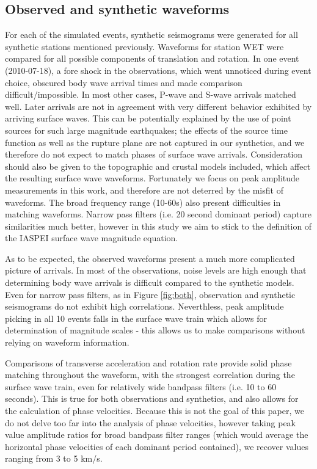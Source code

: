 \documentclass{gji}
\begin{document}
\subsection{Observed and synthetic waveforms}
For each of the simulated events, synthetic seismograms were generated for all synthetic stations mentioned previously. Waveforms for station WET were compared for all possible components of translation and rotation. In one event (2010-07-18), a fore shock in the observations, which went unnoticed during event choice, obscured body wave arrival times and made comparison difficult/impossible. In most other cases, P-wave and S-wave arrivals matched well. Later arrivals are not in agreement with very different behavior exhibited by arriving surface waves. This can be potentially explained by the use of point sources for such large magnitude earthquakes; the effects of the source time function as well as the rupture plane are not captured in our synthetics, and we therefore do not expect to match phases of surface wave arrivals. Consideration should also be given to the topographic and crustal models included, which affect the resulting surface wave waveforms. Fortunately we focus on peak amplitude measurements in this work, and therefore are not deterred by the misfit of waveforms. The broad frequency range (10-60s) also present difficulties in matching waveforms. Narrow pass filters (i.e. 20 second dominant period) capture similarities much better, however in this study we aim to stick to the definition of the IASPEI surface wave magnitude equation.


As to be expected, the observed waveforms present a much more complicated picture of arrivals. In most of the observations, noise levels are high enough that determining body wave arrivals is difficult compared to the synthetic models. Even for narrow pass filters, as in Figure \ref{fig:both}, observation and synthetic seismograms do not exhibit high correlations. Neverthless, peak amplitude picking in all 10 events falls in the surface wave train which allows for determination of magnitude scales - this allows us to make comparisons without relying on waveform information.

Comparisons of transverse acceleration and rotation rate provide solid phase matching throughout the waveform, with the strongest correlation during the surface wave train, even for relatively wide bandpass filters (i.e. 10 to 60 seconds). This is true for both observations and synthetics, and also allows for the calculation of phase velocities. Because this is not the goal of this paper, we do not delve too far into the analysis of phase velocities, however taking peak value amplitude ratios for broad bandpass filter ranges (which would average the horizontal phase velocities of each dominant period contained), we recover values ranging from 3 to 5 km/s. 
\end{document}
